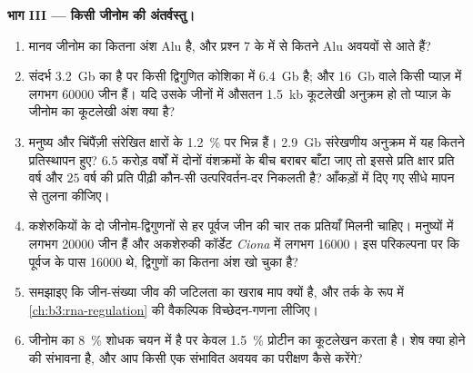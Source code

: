 \begin{problem}
\medskip
\noindent\textbf{भाग III --- किसी जीनोम की अंतर्वस्तु।}
\begin{enumerate}[resume]
  \item मानव जीनोम का कितना अंश Alu है, और प्रश्न 7 के  में से
        कितने Alu अवयवों से आते हैं?
  \item संदर्भ \qty{3.2}{Gb} का है पर किसी द्विगुणित कोशिका में
        \qty{6.4}{Gb} है; और \qty{16}{Gb} वाले किसी प्याज़ में लगभग
        \num{60000} जीन हैं। यदि उसके जीनों में औसतन \qty{1.5}{kb}
        कूटलेखी अनुक्रम हो तो प्याज़ के जीनोम का कूटलेखी अंश क्या है?
  \item मनुष्य और चिंपैंज़ी संरेखित क्षारों के \qty{1.2}{\%} पर भिन्न
        हैं। \qty{2.9}{Gb} संरेखणीय अनुक्रम में यह कितने प्रतिस्थापन
        हुए? $6.5$ करोड़ वर्षों में दोनों वंशक्रमों के बीच बराबर बाँटा
        जाए तो इससे प्रति क्षार प्रति वर्ष और $25$ वर्ष की प्रति पीढ़ी
        कौन-सी उत्परिवर्तन-दर निकलती है? आँकड़ों में दिए गए सीधे मापन
        से तुलना कीजिए।
  \item कशेरुकियों के दो जीनोम-द्विगुणनों से हर पूर्वज जीन की चार तक
        प्रतियाँ मिलनी चाहिए। मनुष्यों में लगभग \num{20000} जीन हैं और
        अकशेरुकी कॉर्डेट \emph{Ciona} में लगभग \num{16000}। इस
        परिकल्पना पर कि पूर्वज के पास \num{16000} थे, द्विगुणों का
        कितना अंश खो चुका है?
  \item समझाइए कि जीन-संख्या जीव की जटिलता का खराब माप क्यों है, और
        तर्क के रूप में \cref{ch:b3:rna-regulation} की वैकल्पिक
        विच्छेदन-गणना लीजिए।
  \item जीनोम का \qty{8}{\%} शोधक चयन में है पर केवल \qty{1.5}{\%}
        प्रोटीन का कूटलेखन करता है। शेष क्या होने की संभावना है, और आप
        किसी एक संभावित अवयव का परीक्षण कैसे करेंगे?
\end{enumerate}


\end{problem}
